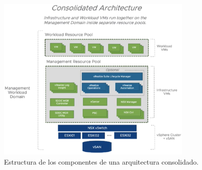 \begin{figure}[h!]
  \centering
  \includegraphics[width=0.85\textwidth]{imaxes/conceptosPrevios/consolidatedArch.png}
  \caption{Estructura de los componentes de una arquitectura consolidado.}
  \label{fig:consolidatedArch}
\end{figure}
\FloatBarrier


